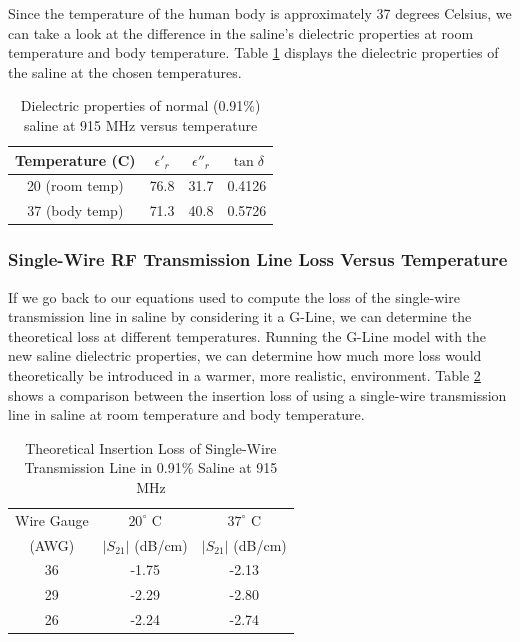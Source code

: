 \documentclass[12pt,onecolumn,titlepage]{article}
\begin{document}
Since the temperature of the human body is approximately 37 degrees Celsius, we can take a look at the difference in the saline's dielectric properties at room temperature and body temperature. Table \ref{tab:saline_v_temp} displays the dielectric properties of the saline at the chosen temperatures. 


\begin{table}[h]
\centering
	\caption{Dielectric properties of normal (0.91\%) saline at 915 MHz versus temperature}
	\begin{tabular}{| c | c | c | c |}
	\hline
	 Temperature (C) & $\epsilon'_r$ & $\epsilon''_r$ & $\tan \delta$ \\ \hline
	 20 (room temp) & 76.8 & 31.7 & 0.4126 \\ \hline
	 37 (body temp) & 71.3 & 40.8 & 0.5726  \\ \hline
	 \end{tabular}
\label{tab:saline_v_temp}
\end{table}



\subsubsection{Single-Wire RF Transmission Line Loss Versus Temperature}
\indent \indent If we go back to our equations used to compute the loss of the single-wire transmission line in saline by considering it a G-Line, we can determine the theoretical loss at different temperatures. Running the G-Line model with the new saline dielectric properties, we can determine how much more loss would theoretically be introduced in a warmer, more realistic, environment. Table \ref{tab:SWTL_IL_v_temp} shows a comparison between the insertion loss of using a single-wire transmission line in saline at room temperature and body temperature.


\begin{table}[h!]
\centering
	\caption{Theoretical Insertion Loss of Single-Wire Transmission Line in 0.91\% Saline at 915 MHz}
	\begin{tabular}{| c | c | c|}
	\hline
		 Wire Gauge & $20^\circ$ C & $37^\circ$ C \\
	 (AWG)  & $|S_{21}|$ (dB/cm) &  $|S_{21}|$ (dB/cm) \\  \hline
	 36 & -1.75 & -2.13 \\ \hline
	 29 & -2.29 & -2.80 \\ \hline
	 26 & -2.24 & -2.74 \\ \hline
	 \end{tabular}
\label{tab:SWTL_IL_v_temp}
\end{table}
\end{document}
